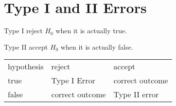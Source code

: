 \documentclass[letterpaper, landscape]{exam}
\begin{document}
  \section{Type I and II Errors}
  \begin{description*}
    \item[Type I] reject $H_0$ when it is actually true.
    \item[Type II] accept $H_0$ when it is actually false.
  \end{description*}

  \begin{tabular}[H]{lll}
     hypothesis & reject          & accept \\
     true       & Type I Error    & correct outcome \\
     false      & correct outcome & Type II error \\
  \end{tabular}
\end{document}
